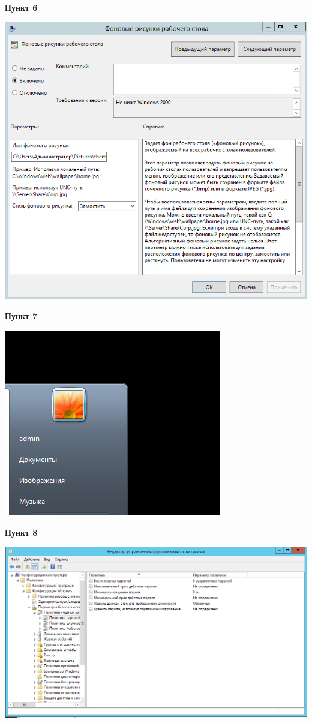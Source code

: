 \documentclass[a4paper,14pt]{extarticle}
\begin{document}
    \textbf{Пункт 6}
    \begin{center}
        \includegraphics[scale=0.6]{6.png}
    \end{center}
    \newpage
    \textbf{Пункт 7}
    \begin{center}
        \includegraphics{7}
    \end{center}
    \textbf{Пункт 8}
    \begin{center}
        \includegraphics[scale=0.6]{8}
    \end{center}
\end{document}

